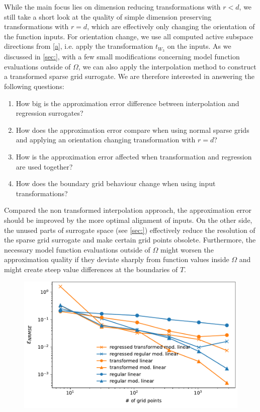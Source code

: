 \documentclass[
  a4paper,  %
  twoside,  %
  bibliography=totoc,
  headsepline,
  cleardoublepage=empty,
  parskip=half,
  draft=false
]{scrbook}
\begin{document}
While the main focus lies on dimension reducing transformations with $r < d$, we still take a short look at the quality of simple dimension preserving transformations with $r=d$, which are effectively only changing the orientation of the function inputs.
For orientation change, we use all computed active subspace directions from \cref{a}, i.e. apply the transformation $t_{W_3}$ on the inputs.
As we discussed in \cref{sec:}, with a few small modifications concerning model function evaluations outside of $\Omega$, we can also apply the interpolation method to construct a transformed sparse grid surrogate.
We are therefore interested in answering the following questions:
\begin{enumerate}
\item How big is the approximation error difference between interpolation and regression surrogates?
\item How does the approximation error compare when using normal sparse grids and applying an orientation changing transformation with $r=d$?
\item How is the approximation error affected when transformation and regression are used together?
\item How does the boundary grid behaviour change when using input transformations?
\end{enumerate}

Compared the non transformed interpolation approach, the approximation error should be improved by the more optimal alignment of inputs.
On the other side, the unused parts of surrogate space (see \cref{sec:}) effectively reduce the resolution of the sparse grid surrogate and make certain grid points obsolete.
Furthermore, the necessary model function evaluations outside of $\Omega$ might worsen the approximation quality if they deviate sharply from function values inside $\Omega$ and might create steep value differences at the boundaries of $T$.

\begin{mdframed}[style=style]
\begin{figure}[H]
\includegraphics[width=\textwidth]{graphics/ishigami_orientation}
\delimit

\label{fig:ishigami_errors}
\end{figure}
\end{mdframed}
\end{document}
